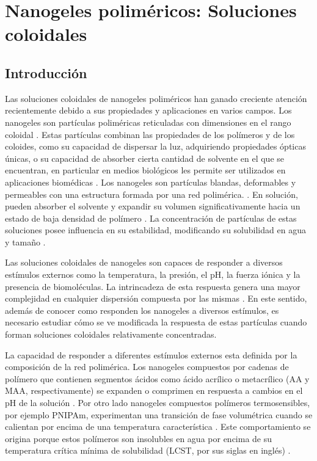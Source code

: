 \chapter{Nanogeles polim\'ericos: Soluciones coloidales} \label{chapter:mc:soluciones}
	

	
	\section{Introducci\'on}
	
	Las soluciones coloidales de nanogeles polim\'ericos han ganado creciente atenci\'on recientemente  debido a sus propiedades y aplicaciones en varios campos. Los nanogeles son part\'iculas polim\'ericas reticuladas con dimensiones en el rango coloidal \cite{10.1002/pola.27653}. Estas part\'iculas combinan las propiedades de los pol\'imeros y de los coloides, como su capacidad de dispersar la luz, adquiriendo propiedades \'opticas \'unicas, o su capacidad de absorber cierta cantidad de solvente en el que se encuentran, en particular en medios biol\'ogicos les permite ser utilizados en aplicaciones biom\'edicas \cite{lyon2012polymer}. Los nanogeles son part\'iculas blandas, deformables y permeables con una estructura formada por una red polim\'erica. \cite{lyon2012polymer}. En soluci\'on, pueden absorber el solvente y expandir su volumen significativamente hacia un estado de baja densidad de pol\'imero \cite{karg2019nanogels, perez2021thermodynamic}. La concentraci\'on de part\'iculas de estas soluciones posee influencia en su estabilidad,  modificando su solubilidad en agua y tama\~no \cite{10.3390/polym13234071}. 
	
	Las soluciones coloidales de nanogeles son capaces de responder a diversos est\'imulos externos como la temperatura, la presi\'on, el pH, la fuerza i\'onica y la presencia de biomol\'eculas.
	La intrincadeza de esta respuesta genera una mayor complejidad en cualquier dispersi\'on compuesta por las mismas \cite{lyon2012polymer}.
	En este sentido, adem\'as de conocer como responden los nanogeles a diversos est\'imulos, es necesario estudiar c\'omo se ve modificada la respuesta de estas part\'iculas cuando forman soluciones coloidales relativamente concentradas. 
	
	La  capacidad de responder a diferentes est\'imulos externos esta definida por la composici\'on de la red polim\'erica. Los nanogeles compuestos por cadenas de pol\'imero que contienen segmentos \'acidos como \'acido acr\'ilico o metacr\'ilico (AA y MAA, respectivamente) se expanden o comprimen en respuesta a cambios en el pH de la soluci\'on \cite{snowden1996colloidal, Zhou1998}. Por otro lado nanogeles compuestos pol\'imeros termosensibles, por ejemplo PNIPAm, experimentan una transici\'on de fase volum\'etrica cuando se calientan por encima de una temperatura caracter\'istica \cite{Pelton1986, Pelton2000}. Este comportamiento se origina porque estos pol\'imeros son insolubles en agua por encima de su temperatura cr\'itica m\'inima de solubilidad (LCST, por sus siglas en ingl\'es) \cite{Kawaguchi2020}.
	
